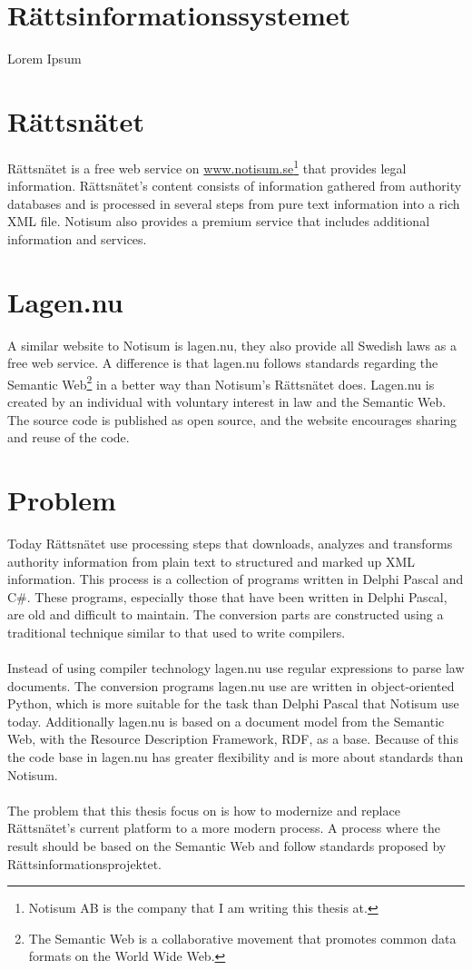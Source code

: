 \documentclass[a4paper,11pt]{kth-mag}
\begin{document}
\section{Rättsinformationssystemet}
Lorem Ipsum

\section{Rättsnätet} Rättsnätet is a free web service on
\url{www.notisum.se}\footnote{Notisum AB is the company that I am writing this thesis at.} that provides legal
information. Rättsnätet’s content consists of information gathered from
authority databases and is processed in several steps from pure text information
into a rich XML file. Notisum also provides a premium service that includes
additional information and services.

\section{Lagen.nu}
A similar website to Notisum is lagen.nu, they also provide all Swedish laws as a free web service. A difference is that lagen.nu follows standards regarding the Semantic Web\footnote{The Semantic Web is a collaborative movement that promotes common data formats on the World Wide Web.} in a better way than Notisum's Rättsnätet does. Lagen.nu is created by an individual with voluntary interest in law and the Semantic Web. The source code is published as open source, and the website encourages sharing and reuse of the code. 

\section{Problem}
Today Rättsnätet use processing steps that downloads, analyzes and transforms authority information from plain text to structured and marked up XML information. This process is a collection of programs written in Delphi Pascal and C\#. These programs, especially those that have been written in Delphi Pascal, are old and difficult to maintain. The conversion parts are constructed using a traditional technique similar to that used to write compilers.\\\\
Instead of using compiler technology lagen.nu use regular expressions to parse law documents. The conversion programs lagen.nu use are written in object-oriented Python, which is more suitable for the task than Delphi Pascal that Notisum use today. Additionally lagen.nu is based on a document model from the Semantic Web, with the Resource Description Framework, RDF, as a base. Because of this the code base in lagen.nu has greater flexibility and is more about standards than Notisum.\\\\
The problem that this thesis focus on is how to modernize and replace Rättsnätet's current platform to a more modern process. A process where the result should be based on the Semantic Web and follow standards proposed by Rättsinformationsprojektet.
\end{document}
